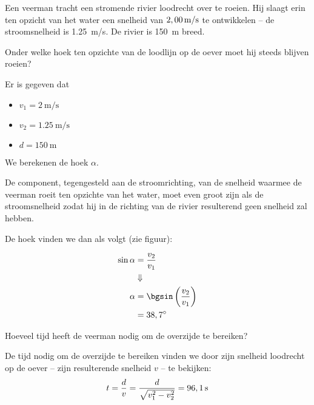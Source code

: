 \documentclass{ximera}
\begin{document}
\begin{exercise}

Een veerman tracht een stromende rivier loodrecht over te roeien. 
Hij slaagt erin ten opzicht van het water een snelheid van $2,00\rm\,m/s$ te ontwikkelen -- de stroomsnelheid is \SI{1,25}{m/s}. 
De rivier is \SI{150}{\meter} breed. 

\begin{question}
 Onder welke hoek ten opzichte van de loodlijn op de oever moet hij steeds blijven roeien?
\begin{oplossing}
Er is gegeven dat

\begin{itemize}
	\item $v_1=\SI{2}{\meter\per\second}$
	\item$v_2=\SI{1,25}{\meter\per\second}$
	\item $d=\SI{150}{\meter}$
\end{itemize}

We berekenen de hoek $\alpha$. 


De component, tegengesteld aan de stroomrichting, van de snelheid waarmee de veerman roeit ten opzichte van het water, moet even groot zijn als de stroomsnelheid zodat hij in de richting van de rivier resulterend
geen snelheid zal hebben. 


De hoek vinden we dan als volgt (zie figuur):

\begin{align*}
\sin{\alpha} &= \frac{v_2}{v_1}\\
&\Downarrow\\
\alpha&=\bgsin\left(\frac{v_2}{v_1}\right)\\
&=38,7^\circ
\end{align*}

\end{oplossing}

\end{question}
\begin{question}
Hoeveel tijd heeft de veerman nodig om de overzijde te bereiken? 

\begin{oplossing}
De tijd nodig om de overzijde te bereiken vinden we door zijn snelheid loodrecht op de oever -- zijn resulterende snelheid $v$ -- te bekijken:
	\begin{align*}
		t=\frac{d}{v}=\frac{d}{\sqrt{v_1^2-v_2^2}}=96,1{\rm\,s}
	\end{align*}

\end{oplossing}
\end{question}
\end{exercise}
\end{document}
